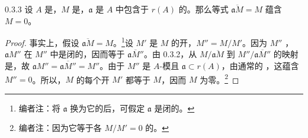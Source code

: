 \begin{SGAresult}{}{0.3.3}
设 $A$ 是，$M$ 是，$\mathfrak a$ 是 $A$ 中包含于 $r(A)$ 的。那么等式 $\overline{\mathfrak aM}=M$ 蕴含 $M=0$。
\end{SGAresult}
\begin{proof}
事实上，假设 $\overline{\mathfrak aM}=M$。\footnote{编者注：将 $\mathfrak a$ 换为它的后，可假定 $\mathfrak a$ 是闭的。}设 $M'$ 是 $M$ 的开，$M''=M/M'$。因为 $M''$ ，$\mathfrak aM''$ 在 $M''$ 中是闭的，因而等于 $\overline{\mathfrak aM''}$。由 0.3.2，从 $M/\overline{\mathfrak aM}$ 到 $M''/\overline{\mathfrak aM''}$ 的映射是，故 $\mathfrak aM''=\overline{\mathfrak aM''}=M''$。由于 $M''$ 是 $A$-模且 $\mathfrak a\subset r(A)$，由通常的 ，这蕴含 $M''=0$。所以，$M$ 的每个开 $M'$ 都等于 $M$，因而 $M$ 为零。\footnote{编者注：因为它等于各 $M/M'=0$ 的。}
\end{proof}


